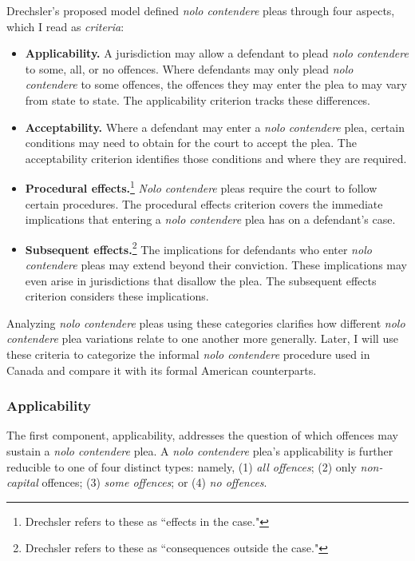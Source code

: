 Drechsler's proposed model defined \textit{nolo contendere} pleas through four aspects, which I read as \textit{criteria}:

\begin{itemize}
    \item \textbf{Applicability.} A jurisdiction may allow a defendant to plead \textit{nolo contendere} to some, all, or no offences. Where defendants may only plead \textit{nolo contendere} to some offences, the offences they may enter the plea to may vary from state to state. The applicability criterion tracks these differences.
    \item \textbf{Acceptability.} Where a defendant may enter a \textit{nolo contendere} plea, certain conditions may need to obtain for the court to accept the plea. The acceptability criterion identifies those conditions and where they are required.
    \item \textbf{Procedural effects.}\footnote{Drechsler refers to these as ``effects in the case."} \textit{Nolo contendere} pleas require the court to follow certain procedures. The procedural effects criterion covers the immediate implications that entering a \textit{nolo contendere} plea has on a defendant's case.
    \item \textbf{Subsequent effects.}\footnote{Drechsler refers to these as ``consequences outside the case."} The implications for defendants who enter \textit{nolo contendere} pleas may extend beyond their conviction. These implications may even arise in jurisdictions that disallow the plea. The subsequent effects criterion considers these implications.
\end{itemize}
Analyzing \textit{nolo contendere} pleas using these categories clarifies how different \textit{nolo contendere} plea variations relate to one another more generally. Later, I will use these criteria to categorize the informal \textit{nolo contendere} procedure used in Canada and compare it with its formal American counterparts.

\subsubsection{Applicability}

The first component, applicability, addresses the question of which offences may sustain a \textit{nolo contendere} plea. A \textit{nolo contendere} plea's applicability is further reducible to one of four distinct types: namely, (1) \textit{all offences}; (2) only \textit{non-capital} offences; (3) \textit{some offences}; or (4) \textit{no offences}. 

